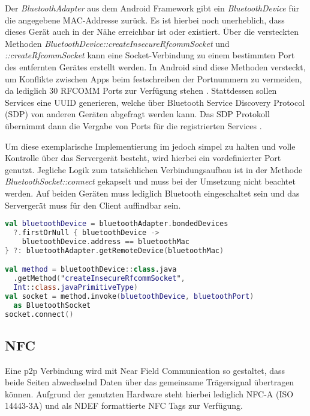         Der {\it BluetoothAdapter} aus dem Android Framework gibt ein {\it BluetoothDevice} für die angegebene MAC-Addresse zurück. Es ist hierbei noch unerheblich, dass dieses Gerät auch in der Nähe erreichbar ist oder existiert. Über die versteckten Methoden {\it BluetoothDevice::createInsecureRfcommSocket} und {\it ::createRfcommSocket} kann eine Socket-Verbindung zu einem bestimmten Port des entfernten Gerätes erstellt werden. In Android sind diese Methoden versteckt, um Konflikte zwischen Apps beim festschreiben der Portnummern zu vermeiden, da lediglich 30 RFCOMM Ports zur Verfügung stehen \cite{bluezRfcomm}. Stattdessen sollen Services eine UUID generieren, welche über Bluetooth Service Discovery Protocol (SDP) von anderen Geräten abgefragt werden kann. Das SDP Protokoll übernimmt dann die Vergabe von Ports für die registrierten Services \cite{androidBluetooth}.
        
        Um diese exemplarische Implementierung im  jedoch simpel zu halten und volle Kontrolle über das Servergerät besteht, wird hierbei ein vordefinierter Port genutzt. Jegliche Logik zum tatsächlichen Verbindungsaufbau ist in der Methode {\it BluetoothSocket::connect} gekapselt und muss bei der Umsetzung nicht beachtet werden. Auf beiden Geräten muss lediglich Bluetooth eingeschaltet sein und das Servergerät muss für den Client auffindbar sein.
        
        \begin{lstlisting}[frame=bt, label={lst:android:bluetooth}, language=Kotlin, caption=Verbindungsaufbau mit Bluetooth (Clientcode in Kotlin)]
val bluetoothDevice = bluetoothAdapter.bondedDevices
  ?.firstOrNull { bluetoothDevice ->
    bluetoothDevice.address == bluetoothMac
} ?: bluetoothAdapter.getRemoteDevice(bluetoothMac)

val method = bluetoothDevice::class.java
  .getMethod("createInsecureRfcommSocket",
  Int::class.javaPrimitiveType)
val socket = method.invoke(bluetoothDevice, bluetoothPort)
  as BluetoothSocket
socket.connect()
        \end{lstlisting}
         
    \subsection{NFC}
        Eine p2p Verbindung wird mit Near Field Communication so gestaltet, dass beide Seiten abwechselnd Daten über das gemeinsame Trägersignal übertragen können.  Aufgrund der genutzten Hardware steht hierbei lediglich NFC-A (ISO 14443-3A) und als NDEF formattierte NFC Tags zur Verfügung. 
        

